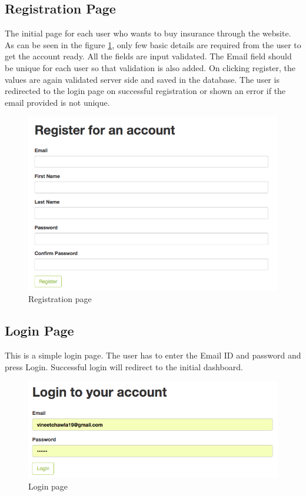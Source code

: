 \subsection{Registration Page}
The initial page for each user who wants to buy insurance through the website. As can be seen in the figure \ref{fig:reg_page}, only few basic details are required from the user to get the account ready. All the fields are input validated. The Email field should be unique for each user so that validation is also added. On clicking register, the values are again validated server side and saved in the database. The user is redirected to the login page on successful registration or shown an error if the email provided is not unique.

\begin{figure}[h]
    \centering
    \includegraphics[width=\textwidth]{Figures/registration_page.png}
    \caption{Registration page}
    \label{fig:reg_page}
\end{figure}

\subsection{Login Page}
This is a simple login page. The user has to enter the Email ID and password and press Login. Successful login will redirect to the initial dashboard.
\begin{figure}[h]
    \centering
    \includegraphics[width=\textwidth]{Figures/login_page.png}
    \caption{Login page}
    \label{fig:login_page}
\end{figure}

